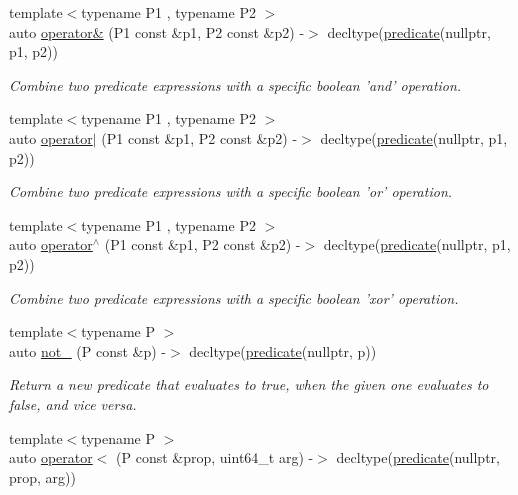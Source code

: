 \begin{DoxyCompactItemize}
{\footnotesize template$<$typename P1 , typename P2 $>$ }\\auto \hyperlink{namespacepfq_1_1lang_aab91c135f631201b35e344e631a79e83}{operator\&} (P1 const \&p1, P2 const \&p2) -\/$>$ decltype(\hyperlink{namespacepfq_1_1lang_aca9adafc436b7f851621b979fa1aaf88}{predicate}(nullptr, p1, p2))
\begin{DoxyCompactList}\small\item\em Combine two predicate expressions with a specific boolean 'and' operation. \end{DoxyCompactList}\item 
{\footnotesize template$<$typename P1 , typename P2 $>$ }\\auto \hyperlink{namespacepfq_1_1lang_a0d4e61b7f964b7ce7a2ce76b038e52aa}{operator$\vert$} (P1 const \&p1, P2 const \&p2) -\/$>$ decltype(\hyperlink{namespacepfq_1_1lang_aca9adafc436b7f851621b979fa1aaf88}{predicate}(nullptr, p1, p2))
\begin{DoxyCompactList}\small\item\em Combine two predicate expressions with a specific boolean 'or' operation. \end{DoxyCompactList}\item 
{\footnotesize template$<$typename P1 , typename P2 $>$ }\\auto \hyperlink{namespacepfq_1_1lang_aa42a32904d2952c1229bf15dd215e91b}{operator$^\wedge$} (P1 const \&p1, P2 const \&p2) -\/$>$ decltype(\hyperlink{namespacepfq_1_1lang_aca9adafc436b7f851621b979fa1aaf88}{predicate}(nullptr, p1, p2))
\begin{DoxyCompactList}\small\item\em Combine two predicate expressions with a specific boolean 'xor' operation. \end{DoxyCompactList}\item 
{\footnotesize template$<$typename P $>$ }\\auto \hyperlink{namespacepfq_1_1lang_aad91ae49c0ddea5a9219f679e8de212a}{not\+\_\+} (P const \&p) -\/$>$ decltype(\hyperlink{namespacepfq_1_1lang_aca9adafc436b7f851621b979fa1aaf88}{predicate}(nullptr, p))
\begin{DoxyCompactList}\small\item\em Return a new predicate that evaluates to true, when the given one evaluates to false, and vice versa. \end{DoxyCompactList}\item 
{\footnotesize template$<$typename P $>$ }\\auto \hyperlink{namespacepfq_1_1lang_a621f0ba92e962637b0a31ed44576149b}{operator$<$} (P const \&prop, uint64\+\_\+t arg) -\/$>$ decltype(\hyperlink{namespacepfq_1_1lang_aca9adafc436b7f851621b979fa1aaf88}{predicate}(nullptr, prop, arg))

\end{DoxyCompactItemize}
